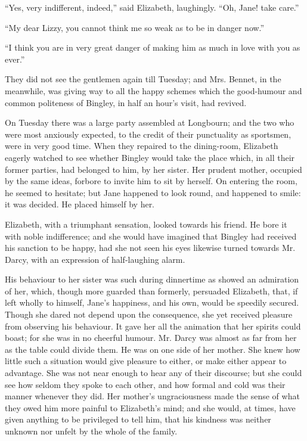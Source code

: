 ``Yes, very indifferent, indeed,'' said Elizabeth, laughingly. ``Oh, Jane! take care.''

``My dear Lizzy, you cannot think me so weak as to be in danger now.''

``I think you are in very great danger of making him as much in love with you as ever.''

They did not see the gentlemen again till Tuesday; and Mrs. Bennet, in the meanwhile, was giving way to all the happy schemes which the good-humour and common politeness of Bingley, in half an hour's visit, had revived.

On Tuesday there was a large party assembled at Longbourn; and the two who were most anxiously expected, to the credit of their punctuality as sportsmen, were in very good time. When they repaired to the dining-room, Elizabeth eagerly watched to see whether Bingley would take the place which, in all their former parties, had belonged to him, by her sister. Her prudent mother, occupied by the same ideas, forbore to invite him to sit by herself. On entering the room, he seemed to hesitate; but Jane happened to look round, and happened to smile: it was decided. He placed himself by her.

Elizabeth, with a triumphant sensation, looked towards his friend. He bore it with noble indifference; and she would have imagined that Bingley had received his sanction to be happy, had she not seen his eyes likewise turned towards Mr. Darcy, with an expression of half-laughing alarm.

His behaviour to her sister was such during dinnertime as showed an admiration of her, which, though more guarded than formerly, persuaded Elizabeth, that, if left wholly to himself, Jane's happiness, and his own, would be speedily secured. Though she dared not depend upon the consequence, she yet received pleasure from observing his behaviour. It gave her all the animation that her spirits could boast; for she was in no cheerful humour. Mr. Darcy was almost as far from her as the table could divide them. He was on one side of her mother. She knew how little such a situation would give pleasure to either, or make either appear to advantage. She was not near enough to hear any of their discourse; but she could see how seldom they spoke to each other, and how formal and cold was their manner whenever they did. Her mother's ungraciousness made the sense of what they owed him more painful to Elizabeth's mind; and she would, at times, have given anything to be privileged to tell him, that his kindness was neither unknown nor unfelt by the whole of the family.

